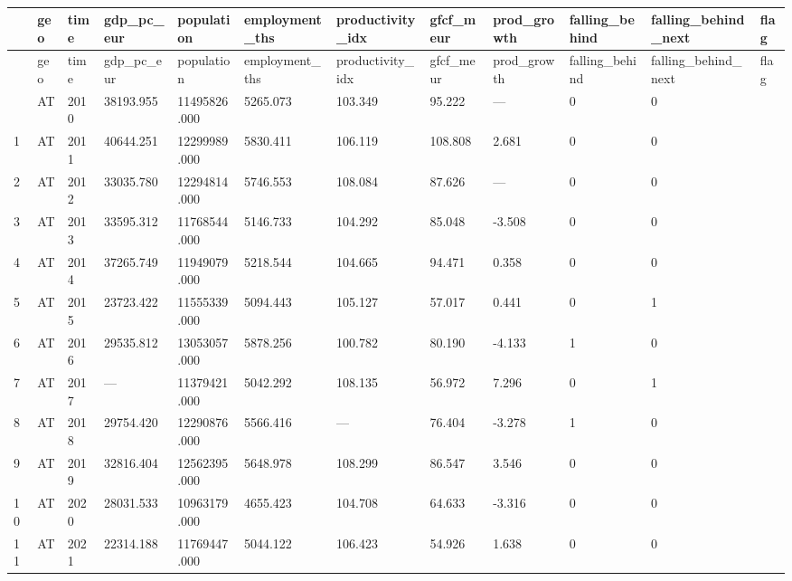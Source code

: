 \documentclass[
  letterpaper,
  10pt,
  twoside,
  openright,
  numbers=noenddot,
  chapterprefix=true]{scrbook}
\begin{document}
\label{view-core-1}
\begin{landscape}\thispagestyle{empty}\begingroup\scriptsize

\begin{longtable}[]{@{}llllllllllll@{}}
\caption{}\label{T_1e841}\tabularnewline
\toprule\noalign{}
~ & geo & time & gdp\_pc\_eur & population & employment\_ths &
productivity\_idx & gfcf\_meur & prod\_growth & falling\_behind &
falling\_behind\_next & flag \\
\midrule\noalign{}
\endfirsthead
\toprule\noalign{}
~ & geo & time & gdp\_pc\_eur & population & employment\_ths &
productivity\_idx & gfcf\_meur & prod\_growth & falling\_behind &
falling\_behind\_next & flag \\
\midrule\noalign{}
\endhead
\bottomrule\noalign{}
\endlastfoot
0 & AT & 2010 & 38193.955 & 11495826.000 & 5265.073 & 103.349 & 95.222 &
--- & 0 & 0 & \\
1 & AT & 2011 & 40644.251 & 12299989.000 & 5830.411 & 106.119 & 108.808
& 2.681 & 0 & 0 & \\
2 & AT & 2012 & 33035.780 & 12294814.000 & 5746.553 & 108.084 & 87.626 &
--- & 0 & 0 & \\
3 & AT & 2013 & 33595.312 & 11768544.000 & 5146.733 & 104.292 & 85.048 &
-3.508 & 0 & 0 & \\
4 & AT & 2014 & 37265.749 & 11949079.000 & 5218.544 & 104.665 & 94.471 &
0.358 & 0 & 0 & \\
5 & AT & 2015 & 23723.422 & 11555339.000 & 5094.443 & 105.127 & 57.017 &
0.441 & 0 & 1 & \\
6 & AT & 2016 & 29535.812 & 13053057.000 & 5878.256 & 100.782 & 80.190 &
-4.133 & 1 & 0 & \\
7 & AT & 2017 & --- & 11379421.000 & 5042.292 & 108.135 & 56.972 & 7.296
& 0 & 1 & \\
8 & AT & 2018 & 29754.420 & 12290876.000 & 5566.416 & --- & 76.404 &
-3.278 & 1 & 0 & \\
9 & AT & 2019 & 32816.404 & 12562395.000 & 5648.978 & 108.299 & 86.547 &
3.546 & 0 & 0 & \\
10 & AT & 2020 & 28031.533 & 10963179.000 & 4655.423 & 104.708 & 64.633
& -3.316 & 0 & 0 & \\
11 & AT & 2021 & 22314.188 & 11769447.000 & 5044.122 & 106.423 & 54.926
& 1.638 & 0 & 0 & \\
\end{longtable}

\endgroup\end{landscape}
\end{document}
